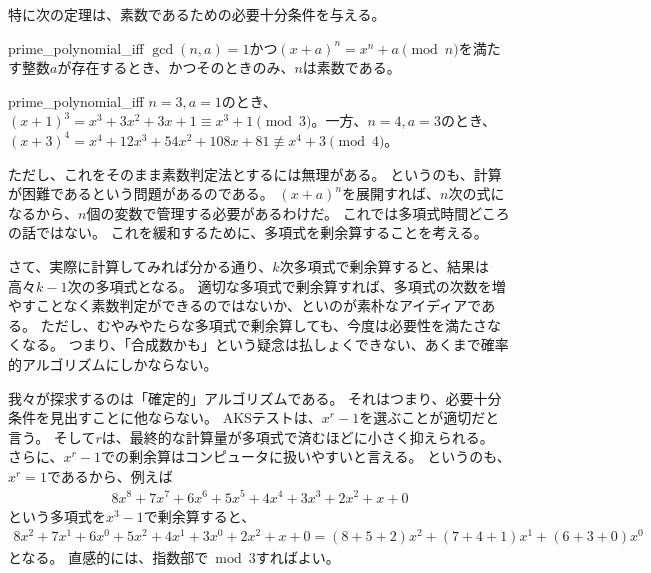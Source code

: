 特に次の定理は、素数であるための必要十分条件を与える。

\begin{Theo}{}{prime_polynomial_iff}
$\gcd(n,a)=1$かつ$(x+a)^n = x^n + a \pmod{n}$を満たす整数$a$が存在するとき、かつそのときのみ、$n$は素数である。
\end{Theo}

\begin{Exam}{}{prime_polynomial_iff}
$n=3,a=1$のとき、$(x+1)^3=x^3+3x^2+3x+1\equiv x^3+1\pmod{3}$。一方、$n=4,a=3$のとき、$(x+3)^4=x^4+12x^3+54x^2+108x+81\not\equiv x^4+3\pmod{4}$。
\end{Exam}

ただし、これをそのまま素数判定法とするには無理がある。
というのも、計算が困難であるという問題があるのである。
$(x+a)^n$を展開すれば、$n$次の式になるから、$n$個の変数で管理する必要があるわけだ。
これでは多項式時間どころの話ではない。
これを緩和するために、多項式を剰余算することを考える。

さて、実際に計算してみれば分かる通り、$k$次多項式で剰余算すると、結果は高々$k-1$次の多項式となる。
適切な多項式で剰余算すれば、多項式の次数を増やすことなく素数判定ができるのではないか、といのが素朴なアイディアである。
ただし、むやみやたらな多項式で剰余算しても、今度は必要性を満たさなくなる。
つまり、「合成数かも」という疑念は払しょくできない、あくまで確率的アルゴリズムにしかならない。

我々が探求するのは「確定的」アルゴリズムである。
それはつまり、必要十分条件を見出すことに他ならない。
AKSテストは、$x^r-1$を選ぶことが適切だと言う。
そして$r$は、最終的な計算量が多項式で済むほどに小さく抑えられる。
さらに、$x^r-1$での剰余算はコンピュータに扱いやすいと言える。
というのも、$x^r=1$であるから、例えば
\begin{align*}
8x^8 + 7x^7 + 6x^6 + 5x^5 + 4x^4 + 3x^3 + 2x^2 + x + 0
\end{align*}
という多項式を$x^3-1$で剰余算すると、
\begin{align*}
8x^2 + 7x^1 + 6x^0 + 5x^2 + 4x^1 + 3x^0 + 2x^2 + x + 0 = (8 + 5 + 2)x^2 + (7 + 4 + 1)x^1 + (6 + 3 + 0)x^0
\end{align*}
となる。
直感的には、指数部で$\bmod{3}$すればよい。





